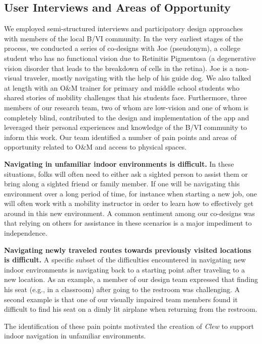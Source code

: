 \documentclass[chi_draft]{sigchi}
\newcommand{\BVI}{B/VI\xspace}
\newcommand{\OM}{O\&M\xspace}
\begin{document}
\subsection{User Interviews and Areas of Opportunity}\label{sec:areasofopportunity}
We employed semi-structured interviews and participatory design approaches \cite{buhler2001empowered, schuler1993participatory} with members of the local \BVI community.  In the very earliest stages of the process, we conducted a series of co-designs with Joe (pseudonym), a college student who has no functional vision due to Retinitis Pigmentosa (a degenerative vision disorder that leads to the breakdown of cells in the retina).  Joe is a non-visual traveler, mostly navigating with the help of his guide dog. We also talked at length with an \OM trainer for primary and middle school students who shared stories of mobility challenges that his students face. Furthermore, three members of our research team, two of whom are low-vision and one of whom is completely blind, contributed to the design and implementation of the app and leveraged their personal experiences and knowledge of the \BVI community to inform this work.  Our team identified a number of pain points and areas of opportunity related to \OM and access to physical spaces.

\textbf{Navigating in unfamiliar indoor environments is difficult.} In these situations, folks will often need to either ask a sighted person to assist them or bring along a sighted friend or family member.  If one will be navigating this environment over a long period of time, for instance when starting a new job, one will often work with a mobility instructor in order to learn how to effectively get around in this new environment.  A common sentiment among our co-designs was that relying on others for assistance in these scenarios is a major impediment to independence.

\textbf{Navigating newly traveled routes towards previously visited locations is difficult.} A specific subset of the difficulties encountered in navigating new indoor environments is navigating back to a starting point after traveling to a new location.  As an example, a member of our design team expressed that finding his seat (e.g., in a classroom) after going to the restroom was challenging.  A second example is that one of our visually impaired team members found it difficult to find his seat on a dimly lit airplane when returning from the restroom.

The identification of these pain points motivated the creation of \emph{Clew} to support indoor navigation in unfamiliar environments.%
\end{document}
